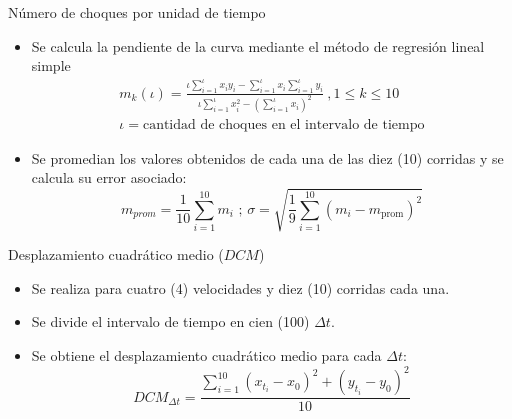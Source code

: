 \documentclass{beamer}
\begin{document}
            \begin{frame}{Número de choques por unidad de tiempo}
                \begin{itemize}
                    \item Se calcula la pendiente de la curva mediante el método de regresión lineal simple
                    \begin{equation*}
                        \begin{split}
                            m_k(\iota) = \frac{\iota \sum_{i=1}^\iota x_i y_i - \sum_{i=1}^\iota x_i \sum_{i=1}^\iota y_i }{\iota \sum_{i=1}^\iota x_i^2 - \left(\sum_{i=1}^\iota x_i \right)^2}
                            \ , 1 \leq k \leq 10
                            \\ \iota = \text{cantidad de choques en el intervalo de tiempo}
                        \end{split}
                    \end{equation*}
                    \item Se promedian los valores obtenidos de cada una de las diez (10) corridas y se calcula su error asociado:
                    \begin{equation*}
                            m_{prom} = \frac{1}{10} \sum_{i=1}^{10} m_i
                        \text{ ; }
                            \sigma = \sqrt{\frac{1}{9} \sum_{i=1}^{10} (m_i - m_{\text{prom}})^2}
                    \end{equation*}
                \end{itemize}
            \end{frame}

            \begin{frame}{Desplazamiento cuadrático medio ($DCM$)}
                \begin{itemize}
                    \item Se realiza para cuatro (4) velocidades y diez (10) corridas cada una.
                    \item Se divide el intervalo de tiempo en cien (100) $\Delta t$.
                    \item Se obtiene el desplazamiento cuadrático medio para cada $\Delta t$:
                    \begin{equation*}
                        DCM_{\Delta t} = \frac{\sum_{i=1}^{10} \left( x_{t_i} - x_0 \right)^2 + \left( y_{t_i} - y_0 \right)^2}{10}
                    \end{equation*}
                \end{itemize}
            \end{frame}
\end{document}
